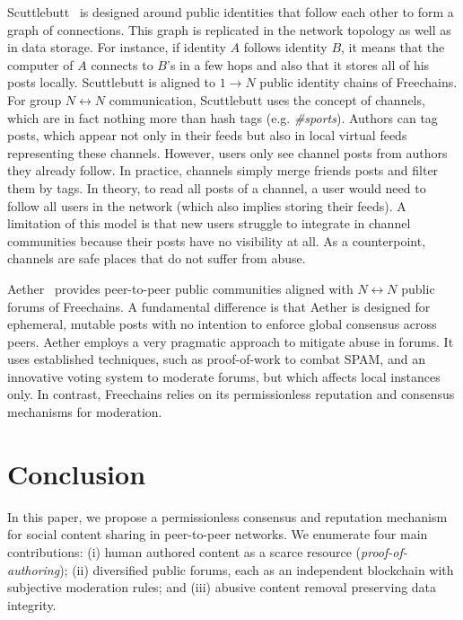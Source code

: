 \documentclass[12pt]{article}
\newcommand{\FC}       {Freechains\xspace}
\newcommand{\Xon} {$1{\rightarrow}N$\xspace}
\newcommand{\Xnn} {$N{\leftrightarrow}N$\xspace}
\begin{document}
Scuttlebutt~\cite{p2p.scuttlebutt} is designed around public identities that
follow each other to form a graph of connections.
This graph is replicated in the network topology as well as in data storage.
For instance, if identity $A$ follows identity $B$, it means that the computer
of $A$ connects to $B$'s in a few hops and also that it stores all of his posts
locally.
Scuttlebutt is aligned to \Xon public identity chains of \FC.
%
For group \Xnn communication, Scuttlebutt uses the concept of channels, which
are in fact nothing more than hash tags (e.g. \emph{\#sports}).
Authors can tag posts, which appear not only in their feeds but also in local
virtual feeds representing these channels.
However, users only see channel posts from authors they already follow.
In practice, channels simply merge friends posts and filter them by tags.
In theory, to read all posts of a channel, a user would need to follow all
users in the network (which also implies storing their feeds).
A limitation of this model is that new users struggle to integrate in channel
communities because their posts have no visibility at all.
As a counterpoint, channels are safe places that do not suffer from abuse.
%

Aether~\cite{p2p.ecosystem} provides peer-to-peer public communities aligned
with \Xnn public forums of \FC.
A fundamental difference is that Aether is designed for ephemeral, mutable
posts with no intention to enforce global consensus across peers.
Aether employs a very pragmatic approach to mitigate abuse in forums.
It uses established techniques, such as proof-of-work to combat SPAM, and an
innovative voting system to moderate forums, but which affects local instances
only.
In contrast, \FC relies on its permissionless reputation and consensus
mechanisms for moderation.

\section{Conclusion}
\label{sec.conclusion}

In this paper, we propose a permissionless consensus and reputation mechanism
for social content sharing in peer-to-peer networks.
We enumerate four main contributions:
    (i)   human authored content as a scarce resource
          (\emph{proof-of-authoring});
    (ii)  diversified public forums, each as an independent blockchain with
          subjective moderation rules; and
    (iii) abusive content removal preserving data integrity.
\end{document}
